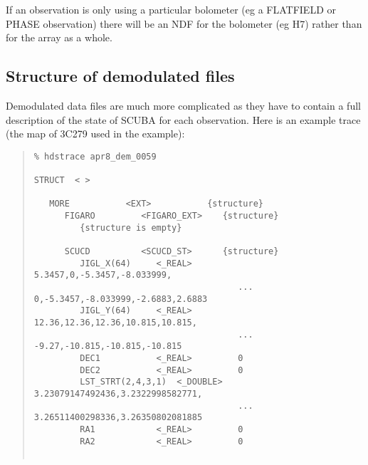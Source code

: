 \documentclass[twoside,11pt]{article}
\newenvironment{myquote}{\begin{quote}\begin{small}}{\end{small}\end{quote}}
\begin{document}
If an observation is only using a particular bolometer (eg a FLATFIELD or
PHASE observation) there will be an NDF for the bolometer (eg H7) rather than
for the array as a whole.


\subsection{Structure of demodulated files\label{demodstruc}}

Demodulated data files are much more complicated as they have to contain a
full description of the state of SCUBA for each observation. 
Here is an example trace (the map of 3C279 used in the example):
\begin{myquote}
\begin{verbatim}
% hdstrace apr8_dem_0059
 
STRUCT  < >
 
   MORE           <EXT>           {structure}
      FIGARO         <FIGARO_EXT>    {structure}
         {structure is empty}
 
      SCUCD          <SCUCD_ST>      {structure}
         JIGL_X(64)     <_REAL>         5.3457,0,-5.3457,-8.033999,
                                        ... 0,-5.3457,-8.033999,-2.6883,2.6883
         JIGL_Y(64)     <_REAL>         12.36,12.36,12.36,10.815,10.815,
                                        ... -9.27,-10.815,-10.815,-10.815
         DEC1           <_REAL>         0
         DEC2           <_REAL>         0
         LST_STRT(2,4,3,1)  <_DOUBLE>   3.23079147492436,3.2322998582771,
                                        ... 3.26511400298336,3.26350802081885
         RA1            <_REAL>         0
         RA2            <_REAL>         0
 

\end{verbatim}
\end{myquote}
\end{document}
